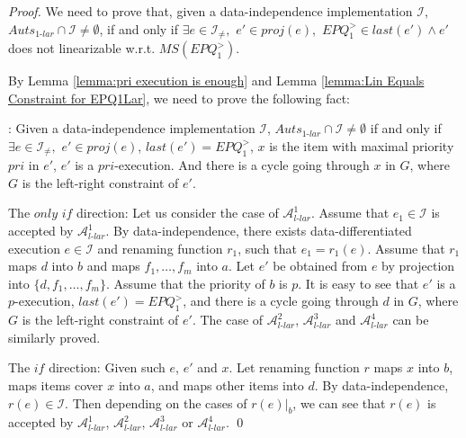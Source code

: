 \begin {proof}

We need to prove that, given a data-independence implementation $\mathcal{I}$, $\textit{Auts}_{\textit{1-lar}} \cap \mathcal{I} \neq \emptyset$, if and only if $\exists e \in \mathcal{I}_{\neq},$ $e' \in \textit{proj}(e),$ $\textit{EPQ}_1^{>} \in last(e') \wedge e'$ does not linearizable w.r.t. $\textit{MS}(\textit{EPQ}_1^{>})$.

By Lemma \ref{lemma:pri execution is enough} and Lemma \ref{lemma:Lin Equals Constraint for EPQ1Lar}, we need to prove the following fact:

: Given a data-independence implementation $\mathcal{I}$, $\textit{Auts}_{\textit{1-lar}} \cap \mathcal{I} \neq \emptyset$ if and only if $\exists e \in \mathcal{I}_{\neq},$ $e' \in \textit{proj}(e)$, $last(e')=\textit{EPQ}_1^{>}$, $x$ is the item with maximal priority $\textit{pri}$ in $e'$, $e'$ is a $\textit{pri}$-execution. And there is a cycle going through $x$ in $G$, where $G$ is the left-right constraint of $e'$.

\noindent The $\textit{only if}$ direction: Let us consider the case of $\mathcal{A}_{\textit{l-lar}}^1$. Assume that $e_1 \in \mathcal{I}$ is accepted by $\mathcal{A}_{\textit{l-lar}}^1$. By data-independence, there exists data-differentiated execution $e \in \mathcal{I}$ and renaming function $r_1$, such that $e_1 = r_1(e)$. Assume that $r_1$ maps $d$ into $b$ and maps $f_1,\ldots,f_m$ into $a$. Let $e'$ be obtained from $e$ by projection into $\{ d, f_1,\ldots,f_m \}$. Assume that the priority of $b$ is $p$. It is easy to see that $e'$ is a $p$-execution, $\textit{last}(e') = \textit{EPQ}_1^{>}$, and there is a cycle going through $d$ in $G$, where $G$ is the left-right constraint of $e'$. The case of $\mathcal{A}_{\textit{l-lar}}^2$, $\mathcal{A}_{\textit{l-lar}}^3$ and $\mathcal{A}_{\textit{l-lar}}^4$ can be similarly proved.

\noindent The $\textit{if}$ direction: Given such $e$, $e'$ and $x$. Let renaming function $r$ maps $x$ into $b$, maps items cover $x$ into $a$, and maps other items into $d$. By data-independence, $r(e) \in \mathcal{I}$. Then depending on the cases of $r(e) \vert_{b}$, we can see that $r(e)$ is accepted by $\mathcal{A}_{\textit{l-lar}}^1$, $\mathcal{A}_{\textit{l-lar}}^2$, $\mathcal{A}_{\textit{l-lar}}^3$ or $\mathcal{A}_{\textit{l-lar}}^4$. \qed
\end {proof}



